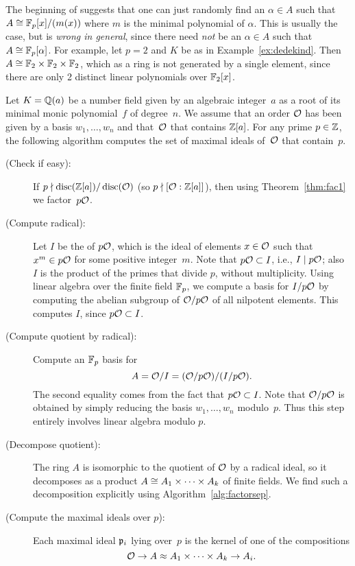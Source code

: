 \begin{remark}
	The beginning of \cite[\S6.2.4]{cohen:course_ant} suggests that one
	can just randomly find an $\alpha \in A$ such that $A\cong
	\mathbb{F}_p[x]/(m(x))$ where $m$ is the minimal polynomial of $\alpha$.
	This is usually the case, but is {\em wrong in general}, since there
	need {\em not} be an $\alpha \in A$ such that $A \cong
	\mathbb{F}_p[\alpha]$.  For example, let $p=2$ and $K$ be as in
	Example~\ref{ex:dedekind}.  Then $A\cong \mathbb{F}_2 \times \mathbb{F}_2 \times
	\mathbb{F}_2$, which as a ring is not generated by a single element, since
	there are only 2 distinct linear polynomials over $\mathbb{F}_2[x]$.
\end{remark}

\begin{algorithm}\label{alg:genfac}
	Let $K=\mathbb{Q}(a)$ be a number field given by an algebraic integer~$a$
	as a root of its minimal monic polynomial~$f$ of degree~$n$.
	We assume that an order $\mathcal{O}$ has been given by a basis $w_1,\ldots,w_n$
	and that~$\mathcal{O}$ that contains $\mathbb{Z}[a]$.
	For any prime $p\in\mathbb{Z}$, the following algorithm computes the set of
	maximal ideals of~$\mathcal{O}$ that contain~$p$.
	\begin{description}
		\item[\normalfont (Check if easy):] If $p\nmid \operatorname{disc}(\mathbb{Z}[a]) / \operatorname{disc}(\mathcal{O})$ (so
		$p\nmid [\mathcal{O}:\mathbb{Z}[a]]$), then using Theorem~\ref{thm:fac1} we
		factor~$p\mathcal{O}$.

		\item[\normalfont (Compute radical):]
		Let $I$ be the  of $p\mathcal{O}$, which is the ideal of
		elements $x\in\mathcal{O}$ such that $x^m\in p\mathcal{O}$
		for some positive integer~$m$.  Note that $p\mathcal{O} \subset I$, i.e.,
		$I\mid p\mathcal{O}$; also~$I$ is the product
		of the primes that divide $p$, without multiplicity.
		Using linear algebra over the finite field
		$\mathbb{F}_p$, we compute a basis for $I/p\mathcal{O}$ by computing
		the abelian subgroup of $\mathcal{O}/p\mathcal{O}$ of all nilpotent
		elements.  This computes $I$, since $p\mathcal{O}\subset I$.

		\item[\normalfont (Compute quotient by radical):]
		Compute an $\mathbb{F}_p$ basis for
		$$
			A = \mathcal{O}/I = (\mathcal{O}/p\mathcal{O})/(I/p\mathcal{O}).
		$$
		The second equality comes from the fact that $p\mathcal{O}\subset I$.
		Note that $\mathcal{O}/p\mathcal{O}$
		is obtained by simply reducing the basis $w_1,\ldots, w_n$ modulo~$p$.
		Thus this step entirely involves linear algebra modulo $p$.

		\item[\normalfont (Decompose quotient):] The ring $A$ is isomorphic to
		the quotient of $\mathcal{O}$ by a radical ideal,
		so it decomposes as a product
		$A \cong A_1 \times \cdots \times A_k$ of finite fields.
		We find such a decomposition explicitly using Algorithm~\ref{alg:factorsep}.

		\item[\normalfont (Compute the maximal ideals over $p$):] Each maximal ideal
		$\mathfrak{p}_i$ lying over~$p$ is the kernel of one of the compositions
		$$
			\mathcal{O} \to A \approx A_1 \times \cdots \times A_k \to A_i.
		$$
	\end{description}
\end{algorithm}
